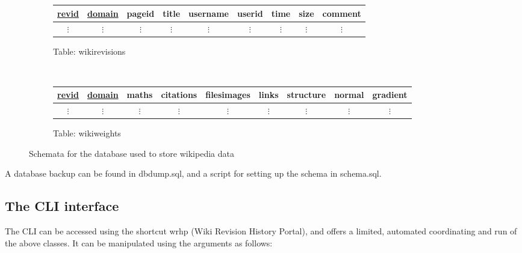 \begin{figure}
\begin{subfigure}[b!]{\linewidth}
    \begin{tabular}{ccccccccc}
      \toprule
      \underline{revid} & \underline{domain} & pageid & title & username & userid & time & size &
      comment \\ 
      \midrule
      $\vdots$ & $\vdots$ & $\vdots$ & $\vdots$ & $\vdots$ & $\vdots$ & $\vdots$
      & $\vdots$ & $\vdots$ \\
    \end{tabular}
    \caption{Table: wikirevisions}
  \end{subfigure}\\
  \begin{subfigure}[b!]{\linewidth}
    \centering
    \begin{tabular}{ccccccccc}
      \toprule
      \underline{revid} & \underline{domain} & maths & citations & filesimages & links &
      structure & normal & gradient\\
      \midrule
      $\vdots$ & $\vdots$ & $\vdots$ & $\vdots$ & $\vdots$ & $\vdots$ &
      $\vdots$ & $\vdots$ & $\vdots$ \\
    \end{tabular}
    \caption{Table: wikiweights} 
  \end{subfigure}
  \caption{Schemata for the database used to store wikipedia data}
  \label{database-schema}
\end{figure}

A database backup can be found in dbdump.sql, and a script for setting
up the schema in schema.sql.

\clearpage

\subsection*{The CLI interface}
The CLI can be accessed using the shortcut wrhp (Wiki Revision History
Portal), and offers a limited, automated coordinating and run of
the above classes. It can be manipulated using the arguments as follows:

